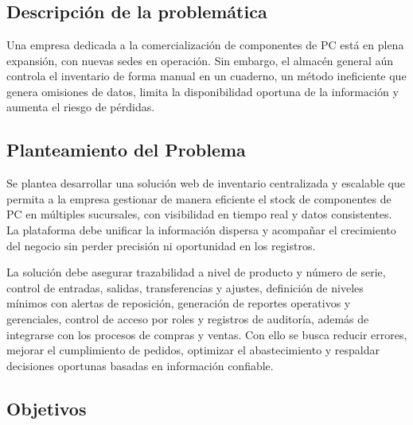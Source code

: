 \documentclass[12pt]{article} %
\begin{document}
\newpage
\section*{}

\subsection*{Descripción de la problemática}

Una empresa dedicada a la comercialización de componentes de PC está en plena expansión, con nuevas sedes en operación. Sin embargo, el almacén general aún controla el inventario de forma manual en un cuaderno, un método ineficiente que genera omisiones de datos, limita la disponibilidad oportuna de la información y aumenta el riesgo de pérdidas.

\subsection*{Planteamiento del Problema}

Se plantea desarrollar una solución web de inventario centralizada y escalable que permita a la empresa gestionar de manera eficiente el stock de componentes de PC en múltiples sucursales, con visibilidad en tiempo real y datos consistentes. La plataforma debe unificar la información dispersa y acompañar el crecimiento del negocio sin perder precisión ni oportunidad en los registros.

La solución debe asegurar trazabilidad a nivel de producto y número de serie, control de entradas, salidas, transferencias y ajustes, definición de niveles mínimos con alertas de reposición, generación de reportes operativos y gerenciales, control de acceso por roles y registros de auditoría, además de integrarse con los procesos de compras y ventas. Con ello se busca reducir errores, mejorar el cumplimiento de pedidos, optimizar el abastecimiento y respaldar decisiones oportunas basadas en información confiable.

\subsection*{Objetivos}
\end{document}
